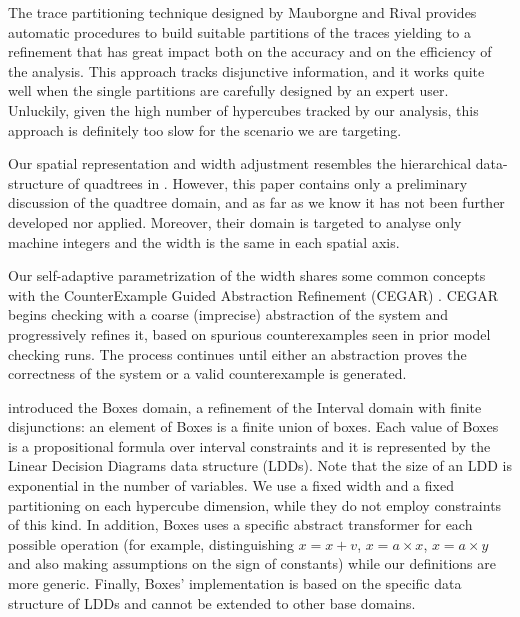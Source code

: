 The trace partitioning technique designed by Mauborgne and Rival \cite{MR05} provides automatic procedures to build suitable partitions of the traces yielding to a refinement that has great impact both on the accuracy and on the efficiency of the analysis. This approach tracks disjunctive information, and it works quite well when the single partitions are carefully designed by an expert user. Unluckily, given the high number of hypercubes tracked by our analysis, this approach is definitely too slow for the scenario we are targeting.

Our spatial representation and width adjustment resembles the hierarchical data-structure of quadtrees in \cite{HKL10}. However, this paper contains only a preliminary discussion of the quadtree domain, and as far as we know it has not been further developed nor applied. %
Moreover, their domain is targeted to analyse only machine integers %
and the width is the same in each spatial axis. %

Our self-adaptive parametrization of the width shares some common concepts with  the CounterExample Guided Abstraction Refinement (CEGAR) \cite{CGJ00}. CEGAR begins checking with a coarse (imprecise) abstraction of the system and progressively refines it, based on spurious counterexamples seen in prior model checking runs. The process continues until either an abstraction proves the correctness of the system or a valid counterexample is generated. 

\cite{GC10} introduced the Boxes domain, a refinement of the Interval domain with finite disjunctions: an element of Boxes is a finite union of boxes. Each value of Boxes is a propositional formula over interval constraints and it is represented by the Linear Decision Diagrams data structure (LDDs). Note that the size of an LDD is exponential in the number of variables. We use a fixed width and a fixed partitioning on each hypercube dimension, while they do not employ constraints of this kind. In addition, Boxes uses a specific abstract transformer for each possible operation (for example, distinguishing $x = x + v$, $x = a \times x$, $x = a \times y$ and also making assumptions on the sign of constants) while our definitions are more generic. Finally, Boxes' implementation is based on the specific data structure of LDDs and cannot be extended to other base domains. %

